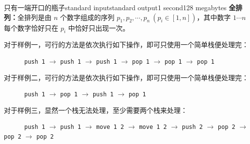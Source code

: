 \begin{problem}{只有一端开口的瓶子}{standard input}{standard output}{1 second}{128 megabytes}
    \Note
    \textbf{全排列：}全排列是由 $n$ 个数字组成的序列 $p_1,p_2,\cdots,p_n\ (p_i\in [1,n])$，其中数字 $1\cdots n$ 每个数字恰好只在 $p_i$ 中恰好只出现一次。

    \Explanation

    对于样例一，可行的方法是依次执行如下操作，即可只使用一个简单栈便处理完：
    
    \ \ \ \ \ \ \texttt{push 1} $\to$ \texttt{push 1} $\to$ \texttt{push 1} $\to$ \texttt{pop 1} $\to$ \texttt{pop 1} $\to$ \texttt{pop 1}

    对于样例二，可行的方法是依次执行如下操作，即可只使用一个简单栈便处理完：
    
    \ \ \ \ \ \ \texttt{push 1} $\to$ \texttt{pop 1} $\to$ \texttt{push 1} $\to$ \texttt{pop 1}

    对于样例三，显然一个栈无法处理，至少需要两个栈来处理：

    \ \ \ \ \ \ \texttt{push 1} $\to$ \texttt{push 1} $\to$ \texttt{move 1 2} $\to$ \texttt{move 1 2} $\to$ \texttt{push 2} $\to$ \texttt{pop 2} $\to$ \texttt{pop 2} $\to$ \texttt{pop 2}

\end{problem}
